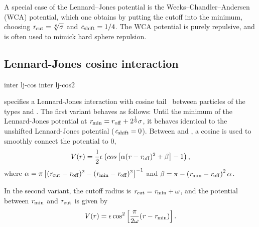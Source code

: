A special case of the Lennard--Jones potential is the
Weeks--Chandler--Andersen (WCA) potential, which one obtains by
putting the cutoff into the minimum, \ie choosing
$\mathrm{\mathit{r_\mathrm{cut}}}=\sqrt[6]{\mathrm{\mathit{\sigma}}}$ and
$\mathrm{\mathit{c_\mathrm{shift}}}=1/4$. The WCA potential is purely repulsive, and
is often used to mimick hard sphere repulsion.

\subsection{Lennard-Jones cosine interaction}
\begin{essyntax}
  inter   lj-cos
  \var{\epsilon} \var{\sigma}
   
  inter   lj-cos2
  \var{\epsilon} \var{\sigma} 
   \var{\omega}
  \begin{features}
  \end{features}
\end{essyntax}
specifies a Lennard-Jones interaction with cosine
tail~\cite{soddeman01a} between particles of the types  and
. The first variant behaves as follows: Until the minimum
of the Lennard-Jones potential at $\mathrm{\mathit{r_\mathrm{min}}} = r_\mathrm{off} +
2^{\frac{1}{6}}\sigma$, it behaves identical to the unshifted
Lennard-Jones potential ($\mathrm{\mathit{c_\mathrm{shift}}}=0$).  Between
 and , a cosine is used to
smoothly connect the potential to 0, \ie
\begin{equation}
  V(r)=\frac{1}{2}\epsilon\left(cos\left[\alpha(\mathrm{\mathit{r}}-\mathrm{\mathit{r_\mathrm{off}}})^2 + \beta\right]-1\right),
\end{equation}
where
$\alpha = \pi\left[(\mathrm{\mathit{r_\mathrm{cut}}}-\mathrm{\mathit{r_\mathrm{off}}})^2-(\mathrm{\mathit{r_\mathrm{min}}}-\mathrm{\mathit{r_\mathrm{off}}})^2\right]^{-1}$
and
$\beta = \pi - \left(\mathrm{\mathit{r_\mathrm{min}}}-\mathrm{\mathit{r_\mathrm{off}}}\right)^2\alpha$.

In the second variant, the cutoff radius is
$\mathrm{\mathit{r_\mathrm{cut}}}=\mathrm{\mathit{r_\mathrm{min}}} + \omega$, and the potential
between $\mathrm{\mathit{r_\mathrm{min}}}$ and $\mathrm{\mathit{r_\mathrm{cut}}}$ is given by
\begin{equation}
  V(r)=\epsilon\cos^2\left[\frac{\pi}{2\omega}(\mathrm{\mathit{r}} - \mathrm{\mathit{r_\mathrm{min}}})\right].
\end{equation}

